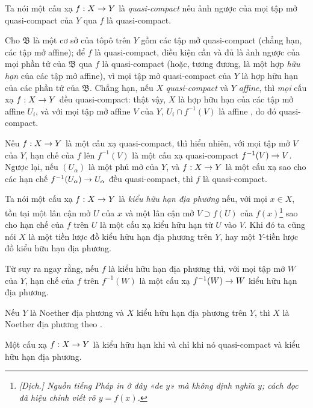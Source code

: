 \documentclass[oneside]{amsart}
\makeatletter
\newcommand{\ega@arrow}[2]{\mathchoice{#1}{#2}{#2}{#2}}
\renewcommand{\to}{\ega@arrow{\longrightarrow}{\rightarrow}}
\newcommand{\oldpage}[2][]{{\marginnote{\normalfont\textbf{#1}~|~#2}}\ignorespaces}
\let\EGAOriginalLabel\label
\renewcommand{\label}[1]{\phantomsection\EGAOriginalLabel{#1}}
\makeatother
\begin{document}
\begin{definition}[6.6.1]
\label{I.6.6.1}
Ta nói một cấu xạ $f:X\to Y$ là \emph{quasi-compact} nếu ảnh ngược của mọi tập mở quasi-compact của $Y$ qua $f$ là quasi-compact.
\end{definition}

Cho $\mathfrak{B}$ là một cơ sở của tôpô trên $Y$ gồm các tập mở quasi-compact (chẳng hạn, các tập mở affine);
để $f$ là quasi-compact, điều kiện cần và đủ là ảnh ngược của mọi phần tử của $\mathfrak{B}$ qua $f$ là quasi-compact (hoặc, tương đương, là một hợp \emph{hữu hạn} của các tập mở affine), vì mọi tập mở quasi-compact của $Y$ là hợp hữu hạn của các phần tử của $\mathfrak{B}$.
Chẳng hạn, nếu $X$ \emph{quasi-compact} và $Y$ \emph{affine}, thì \emph{mọi} cấu xạ $f: X\to Y$ đều quasi-compact:
thật vậy, $X$ là hợp hữu hạn của các tập mở affine $U_i$, và với mọi tập mở affine $V$ của $Y$, $U_i\cap f^{-1}(V)$ là affine , do đó quasi-compact.

Nếu $f: X\to Y$ là một cấu xạ quasi-compact, thì hiển nhiên, với mọi tập mở $V$ của $Y$, hạn chế của $f$ lên $f^{-1}(V)$ là một cấu xạ quasi-compact $f^{-1}(V)\to V$.
Ngược lại, nếu $(U_\alpha)$ là một phủ mở của $Y$, và $f: X\to Y$ là một cấu xạ sao cho các hạn chế $f^{-1}(U_\alpha)\to U_\alpha$ đều quasi-compact, thì $f$ là quasi-compact.

\begin{definition}[6.6.2]
\label{I.6.6.2}
Ta nói một cấu xạ $f: X\to Y$ là \emph{kiểu hữu hạn địa phương} nếu, với mọi $x\in X$, tồn tại một lân cận mở $U$ của $x$ và một lân cận mở $V\supset f(U)$ của $f(x)$\footnote{\emph{[Dịch.] Nguồn tiếng Pháp in ở đây «de $y$» mà không định nghĩa $y$; cách đọc đã hiệu chỉnh viết rõ $y=f(x)$.}} sao cho
\oldpage[I]{153}
hạn chế của $f$ trên $U$ là một cấu xạ kiểu hữu hạn từ $U$ vào $V$.
Khi đó ta cũng nói $X$ là một tiền lược đồ kiểu hữu hạn địa phương trên $Y$, hay một $Y$-tiền lược đồ kiểu hữu hạn địa phương.
\end{definition}

Từ  suy ra ngay rằng, nếu $f$ là kiểu hữu hạn địa phương thì, với mọi tập mở $W$ của $Y$, hạn chế của $f$ trên $f^{-1}(W)$ là một cấu xạ $f^{-1}(W)\to W$ kiểu hữu hạn địa phương.

Nếu $Y$ là Noether địa phương và $X$ kiểu hữu hạn địa phương trên $Y$, thì $X$ là Noether địa phương theo .

\begin{proposition}[6.6.3]
\label{I.6.6.3}
Một cấu xạ $f: X\to Y$ là kiểu hữu hạn khi và chỉ khi nó quasi-compact và kiểu hữu hạn địa phương.
\end{proposition}
\end{document}
